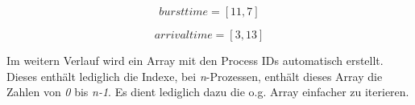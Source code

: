 \documentclass[runningheads]{llncs}
\begin{document}
\begin{equation}
burst time = [ 11, 7 ] 
\end{equation}

\begin{equation}
arrival time = [ 3, 13 ]
\end{equation}



Im weitern Verlauf wird ein Array mit den Process IDs automatisch erstellt. Dieses enthält lediglich die Indexe,
bei \textit{n}-Prozessen, enthält dieses Array die Zahlen von \textit{0} bis \textit{n-1}. Es dient lediglich dazu die o.g. Array einfacher zu iterieren.


%
%
\end{document}
